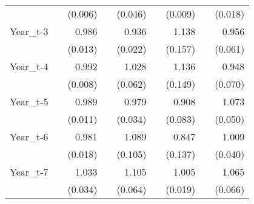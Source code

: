 \begin{table}[htbp]
\begin{tabular}{l*{8}{D{.}{.}{-1}}}
                    &                     &     (0.006)         &                     &     (0.046)         &                     &     (0.009)         &                     &     (0.018)         \\
Year\_t-3            &                     &       0.986         &                     &       0.936\sym{***}&                     &       1.138         &                     &       0.956         \\
                    &                     &     (0.013)         &                     &     (0.022)         &                     &     (0.157)         &                     &     (0.061)         \\
Year\_t-4            &                     &       0.992         &                     &       1.028         &                     &       1.136         &                     &       0.948         \\
                    &                     &     (0.008)         &                     &     (0.062)         &                     &     (0.149)         &                     &     (0.070)         \\
Year\_t-5            &                     &       0.989         &                     &       0.979         &                     &       0.908         &                     &       1.073         \\
                    &                     &     (0.011)         &                     &     (0.034)         &                     &     (0.083)         &                     &     (0.050)         \\
Year\_t-6            &                     &       0.981         &                     &       1.089         &                     &       0.847         &                     &       1.009         \\
                    &                     &     (0.018)         &                     &     (0.105)         &                     &     (0.137)         &                     &     (0.040)         \\
Year\_t-7            &                     &       1.033         &                     &       1.105\sym{*}  &                     &       1.005         &                     &       1.065         \\
                    &                     &     (0.034)         &                     &     (0.064)         &                     &     (0.019)         &                     &     (0.066)         \\

\end{tabular}
\end{table}
